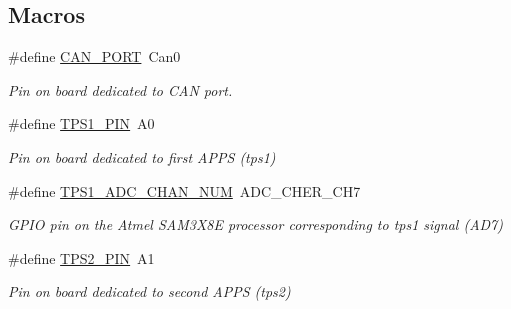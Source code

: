 \subsection*{Macros}
\begin{DoxyCompactItemize}
\item 
\mbox{\label{group___board__pinout__group_gadaeb42d6b221ac2d3e0bd14f05aeefa5}} 
\#define \mbox{\hyperlink{group___board__pinout__group_gadaeb42d6b221ac2d3e0bd14f05aeefa5}{C\+A\+N\+\_\+\+P\+O\+RT}}~Can0
\begin{DoxyCompactList}\small\item\em Pin on board dedicated to C\+AN port. \end{DoxyCompactList}\item 
\mbox{\label{group___board__pinout__group_gae9aa914854f611488701c96a330b0bd4}} 
\#define \mbox{\hyperlink{group___board__pinout__group_gae9aa914854f611488701c96a330b0bd4}{T\+P\+S1\+\_\+\+P\+IN}}~A0
\begin{DoxyCompactList}\small\item\em Pin on board dedicated to first A\+P\+PS (tps1) \end{DoxyCompactList}\item 
\mbox{\label{group___board__pinout__group_ga99b2a7dadaf495e3c559a46440f9141f}} 
\#define \mbox{\hyperlink{group___board__pinout__group_ga99b2a7dadaf495e3c559a46440f9141f}{T\+P\+S1\+\_\+\+A\+D\+C\+\_\+\+C\+H\+A\+N\+\_\+\+N\+UM}}~A\+D\+C\+\_\+\+C\+H\+E\+R\+\_\+\+C\+H7
\begin{DoxyCompactList}\small\item\em G\+P\+IO pin on the Atmel S\+A\+M3\+X8E processor corresponding to tps1 signal (A\+D7) \end{DoxyCompactList}\item 
\mbox{\label{group___board__pinout__group_gab13a816bae3ca994897fc6f1cb590a67}} 
\#define \mbox{\hyperlink{group___board__pinout__group_gab13a816bae3ca994897fc6f1cb590a67}{T\+P\+S2\+\_\+\+P\+IN}}~A1
\begin{DoxyCompactList}\small\item\em Pin on board dedicated to second A\+P\+PS (tps2) \end{DoxyCompactList}\item 
\mbox{\label{group___board__pinout__group_ga4cecb8c10512873904099a1a88d69ed3}} 

\end{DoxyCompactItemize}
